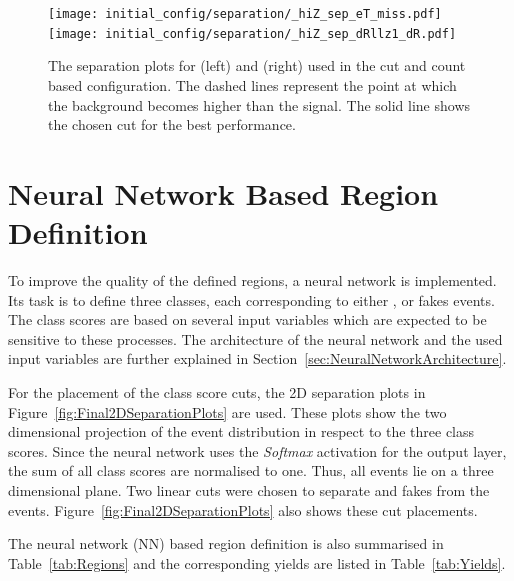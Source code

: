 \documentclass[bachelor,oneside, BCOR10mm,
			ngerman,english  %
]{GAUBM}
\begin{document}
\begin{figure}
	\centering
	\texttt{[image: initial\_config/separation/\_hiZ\_sep\_eT\_miss.pdf]}\hspace{8mm}
	\texttt{[image: initial\_config/separation/\_hiZ\_sep\_dRllz1\_dR.pdf]}
	\caption{The separation plots for \ETMiss (left) and \dR (right) used in the cut and count based configuration. The dashed lines represent the point at which the \ttbarW background becomes higher than the \ttbarZ signal. The solid line shows the chosen cut for the best performance.}
	\label{fig:InitialSeparationPlotsETMissdR}
\end{figure}


\section{Neural Network Based Region Definition}
\label{sec:NeuralNetworkBasedRegionDefinition}
To improve the quality of the defined regions, a neural network is implemented. Its task is to define three classes, each corresponding to either \ttbarZ, \ttbarW or fakes events. The class scores are based on several input variables which are expected to be sensitive to these processes. The architecture of the neural network and the used input variables are further explained in Section~\ref{sec:NeuralNetworkArchitecture}. 

For the placement of the class score cuts, the 2D separation plots in Figure~\ref{fig:Final2DSeparationPlots} are used. These plots show the two dimensional projection of the event distribution in respect to the three class scores. Since the neural network uses the \textit{Softmax} activation for the output layer, the sum of all class scores are normalised to one. Thus, all events lie on a three dimensional plane. Two linear cuts were chosen to separate \ttbarW and fakes from the \ttbarZ events. Figure~\ref{fig:Final2DSeparationPlots} also shows these cut placements.

The neural network (NN) based region definition is also summarised in Table~\ref{tab:Regions} and the corresponding yields are listed in Table~\ref{tab:Yields}.

\end{document}
